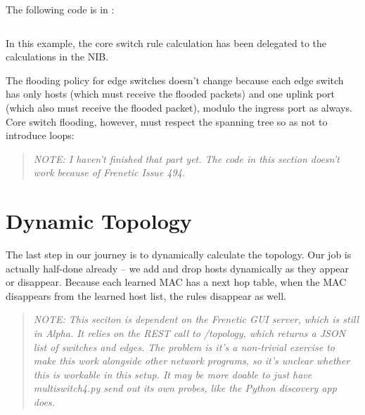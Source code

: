 The following code is in :

\inputminted[firstline=62,lastline=71]{python}{code/multiswitch_topologies/multiswitch2.py}

In this example, the core switch rule calculation has been delegated to the  calculations in
the NIB.  

The flooding policy for edge switches doesn't change because each edge switch has only hosts (which must
receive the flooded packets) and one uplink port (which also must receive the flooded packet), modulo the
ingress port as always.  Core switch flooding, however, must respect the spanning tree so as not to
introduce loops:

\begin{quotation}
\emph{NOTE:  
I haven't finished that part yet.
The code in this section doesn't work because of Frenetic Issue 494.   }
\end{quotation}

\section{Dynamic Topology}

The last step in our journey is to dynamically calculate the topology.  Our job is actually half-done already --
we add and drop hosts dynamically as they appear or disappear.  Because each learned MAC has a next hop table,
when the MAC disappears from the learned host list, the rules disappear as well.  

\begin{quotation}
\emph{NOTE:  This seciton is dependent on the Frenetic GUI server, which is still in Alpha.  It relies on the
REST call to /topology, which returns a JSON list of switches and edges.  The problem is it's a non-trivial 
exercise to make this work alongside other network programs, so it's unclear whether this is workable in this
setup.  It may be more doable to just have multiswitch4.py send out its own probes, like the Python
discovery app does.  
}
\end{quotation}
